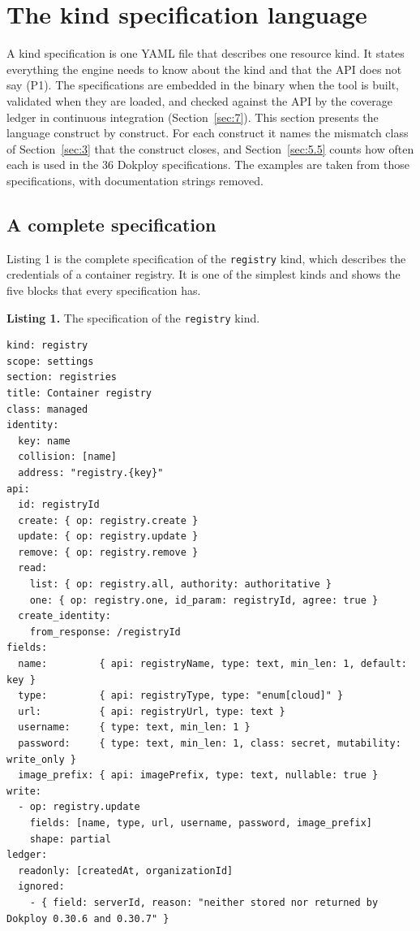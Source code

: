 \section{The kind specification language}\label{sec:5}

A kind specification is one YAML file that describes one resource kind. It states everything the
engine needs to know about the kind and that the API does not say (P1). The specifications are embedded
in the binary when the tool is built, validated when they are loaded, and checked against the API by
the coverage ledger in continuous integration (Section~\ref{sec:7}). This section presents the language construct by construct. For each
construct it names the mismatch class of Section~\ref{sec:3} that the construct closes, and Section~\ref{sec:5.5} counts
how often each is used in the 36 Dokploy specifications. The examples are taken from those
specifications, with documentation strings removed.

\subsection{A complete specification}\label{sec:5.1}

Listing 1 is the complete specification of the \texttt{registry} kind, which describes the credentials of a
container registry. It is one of the simplest kinds and shows the five blocks that every
specification has.

\textbf{Listing 1.} The specification of the \texttt{registry} kind.

\begin{lstlisting}
kind: registry
scope: settings
section: registries
title: Container registry
class: managed
identity:
  key: name
  collision: [name]
  address: "registry.{key}"
api:
  id: registryId
  create: { op: registry.create }
  update: { op: registry.update }
  remove: { op: registry.remove }
  read:
    list: { op: registry.all, authority: authoritative }
    one: { op: registry.one, id_param: registryId, agree: true }
  create_identity:
    from_response: /registryId
fields:
  name:         { api: registryName, type: text, min_len: 1, default: key }
  type:         { api: registryType, type: "enum[cloud]" }
  url:          { api: registryUrl, type: text }
  username:     { type: text, min_len: 1 }
  password:     { type: text, min_len: 1, class: secret, mutability: write_only }
  image_prefix: { api: imagePrefix, type: text, nullable: true }
write:
  - op: registry.update
    fields: [name, type, url, username, password, image_prefix]
    shape: partial
ledger:
  readonly: [createdAt, organizationId]
  ignored:
    - { field: serverId, reason: "neither stored nor returned by Dokploy 0.30.6 and 0.30.7" }
\end{lstlisting}

